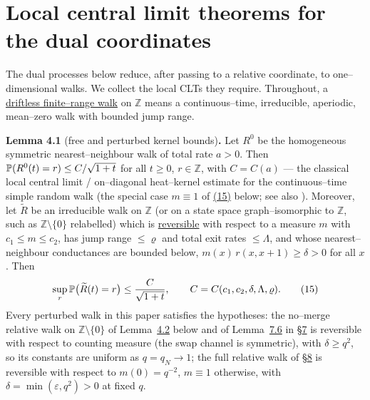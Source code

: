 \documentclass[11pt]{article}
\theoremstyle{plain}
\theoremstyle{definition}
\theoremstyle{remark}
\newcommand{\Z}{\mathbb{Z}}\newcommand{\R}{\mathbb{R}}\newcommand{\N}{\mathbb{N}}
\newcommand{\eps}{\varepsilon}\newcommand{\Exp}{\mathrm{Exp}}
\begin{document}
\section{Local central limit theorems for the dual coordinates}\label{sec_lclt}

The dual processes below reduce, after passing to a relative coordinate, to
one--dimensional walks. We collect the local CLTs they require. Throughout, a
\underline{driftless finite--range walk} on $\Z$ means a continuous--time, irreducible,
aperiodic, mean--zero walk with bounded jump range.

\label{lem_free}\noindent\textbf{Lemma 4.1} (free and perturbed kernel bounds)\textbf{.} 
Let $R^0$ be the homogeneous symmetric nearest--neighbour walk of total rate $a>0$.
Then $\mathbb{P}(R^0(t)=r)\le C/\sqrt{1+t}$ for all $t\ge0$, $r\in\Z$, with $C=C(a)$ --- the
classical local central limit / on--diagonal heat--kernel estimate for the
continuous--time simple random walk (the special case $m\equiv1$ of \hyperref[eq_tildeR]{(15)}
below; see also \cite{LawlerLimic}).
Moreover, let $\widetilde R$ be an irreducible walk on $\Z$ (or on a state space
graph--isomorphic to $\Z$, such as $\Z\setminus\{0\}$ relabelled) which is
\underline{reversible} with respect to a measure $m$ with $c_1\le m\le c_2$, has jump range
$\le\varrho$ and total exit rates $\le\Lambda$, and whose nearest--neighbour
conductances are bounded below, $m(x)\,r(x,x+1)\ge\delta>0$ for all $x$. Then
\label{eq_tildeR}
\begin{equation}
  \sup_{r}\mathbb{P}\big(\widetilde R(t)=r\big)\le \frac{C}{\sqrt{1+t}},
  \qquad C=C(c_1,c_2,\delta,\Lambda,\varrho).\qquad(15)
\end{equation}
Every perturbed walk in this paper satisfies the hypotheses: the no--merge relative
walk on $\Z\setminus\{0\}$ of Lemma~\hyperref[lem_Rlclt]{4.2} below and of Lemma~\hyperref[lem_occ]{7.6} in \S\hyperref[sec_cross]{7} is reversible
with respect to counting measure (the swap channel is symmetric), with $\delta\ge
q^2$, so its constants are uniform as $q=q_N\to1$; the full relative walk of
\S\hyperref[sec_tw]{8} is reversible with respect to $m(0)=q^{-2}$, $m\equiv1$ otherwise, with
$\delta=\min(\eps,q^2)>0$ at fixed $q$.
\par
\end{document}
